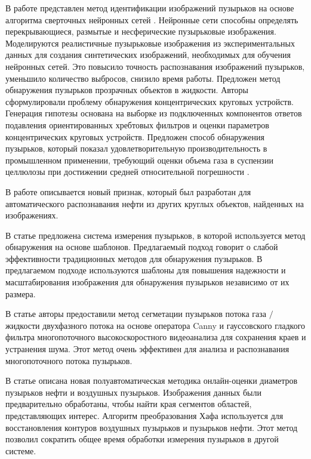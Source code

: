 \documentclass[a4paper,14pt]{extreport}
\begin{document}
В работе \cite{h1bb} представлен метод идентификации изображений пузырьков на основе алгоритма сверточных нейронных сетей \cite{h6bb}. Нейронные сети способны определять перекрывающиеся, размытые и несферические пузырьковые изображения. Моделируются реалистичные пузырьковые изображения из экспериментальных данных для создания синтетических изображений, необходимых для обучения нейронных сетей. Это повысило точность распознавания изображений пузырьков, уменьшило количество выбросов, снизило время работы. Предложен метод обнаружения пузырьков прозрачных объектов в жидкости. Авторы сформулировали проблему обнаружения концентрических круговых устройств. Генерация гипотезы основана на выборке из подключенных компонентов ответов подавления ориентированных хребтовых фильтров и оценки параметров концентрических круговых устройств. Предложен способ обнаружения пузырьков, который показал удовлетворительную производительность в промышленном применении, требующий оценки объема газа в суспензии целлюлозы при достижении средней относительной погрешности \cite{h2bb}.

В работе \cite{h3bb} описывается новый признак, который был разработан для автоматического распознавания нефти из других круглых объектов, найденных на изображениях.

В статье \cite{h4bb} предложена система измерения пузырьков, в которой используется метод обнаружения на основе шаблонов. Предлагаемый подход говорит о слабой эффективности традиционных методов для обнаружения пузырьков. В предлагаемом подходе используются шаблоны для повышения надежности и масштабирования изображения для обнаружения пузырьков независимо от их размера.

В статье \cite{h5bb} авторы предоставили метод сегметации пузырьков потока газа $/$ жидкости двухфазного потока на основе оператора Canny \cite{h7bb} и гауссовского гладкого фильтра \cite{h8bb} многопоточного высокоскоростного видеоанализа для сохранения краев и устранения шума. Этот метод очень эффективен для анализа и распознавания многопоточного потока пузырьков.

В статье \cite{h9bb} описана новая полуавтоматическая методика онлайн-оценки диаметров пузырьков нефти и воздушных пузырьков. Изображения данных были предварительно обработаны, чтобы найти края сегментов областей, представляющих интерес. Алгоритм преобразования Хафа \cite{h10bb} используется для восстановления контуров воздушных пузырьков и  пузырьков нефти. Этот метод позволил сократить общее время обработки измерения пузырьков в другой системе.
\end{document}
